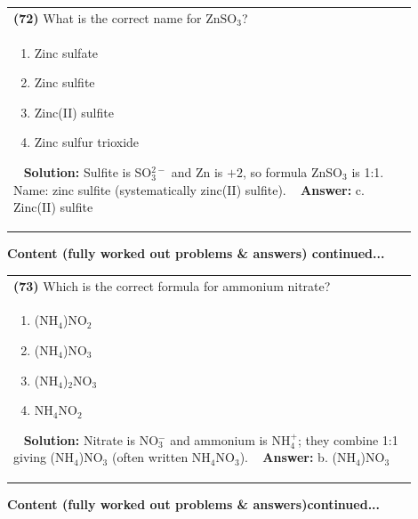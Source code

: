 \documentclass{article}
\begin{document}
\begin{tabular}{|p{0.9\linewidth}|}
\hline
\vspace{0.2cm}
\textbf{(72)} What is the correct name for $\text{ZnSO}_3$? \\
\begin{minipage}[t]{0.85\linewidth}
\begin{enumerate}[label=\alph*.]
\item Zinc sulfate \
\item Zinc sulfite \
\item Zinc(II) sulfite \
\item Zinc sulfur trioxide
\end{enumerate}
\end{minipage}\
\hline
\vspace{0.2cm}
\textbf{Solution:} Sulfite is SO$_3^{2-}$ and Zn is $+2$, so formula ZnSO$_3$ is 1:1. Name: zinc sulfite (systematically zinc(II) sulfite). \
\hline
\vspace{0.2cm}
\textbf{Answer:} c. Zinc(II) sulfite \
\hline
\end{tabular}
\newpage
\noindent
{\large\textbf{Content (fully worked out problems & answers) continued...}}\\[0.2em]
\begin{tabular}{|p{0.9\linewidth}|}
\hline
\vspace{0.2cm}
\textbf{(73)} Which is the correct formula for ammonium nitrate? \\
\begin{minipage}[t]{0.85\linewidth}
\begin{enumerate}[label=\alph*.]
\item (NH$_4$)NO$_2$ \
\item (NH$_4$)NO$_3$ \
\item (NH$_4$)$_2$NO$_3$ \
\item NH$_4$NO$_2$
\end{enumerate}
\end{minipage}\
\hline
\vspace{0.2cm}
\textbf{Solution:} Nitrate is NO$_3^-$ and ammonium is NH$_4^+$; they combine 1:1 giving (NH$_4$)NO$_3$ (often written NH$_4$NO$_3$). \
\hline
\vspace{0.2cm}
\textbf{Answer:} b. (NH$_4$)NO$_3$ \
\hline
\end{tabular}
\newpage
\noindent
{\large\textbf{Content (fully worked out problems & answers)continued...}}\\[0.2em]
\end{document}
